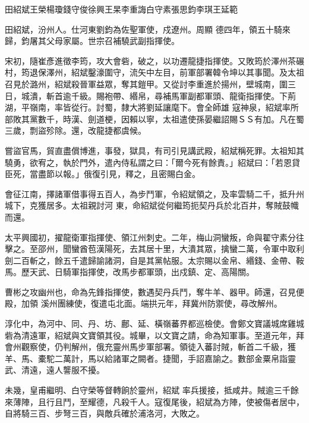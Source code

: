 
\begin{pinyinscope}

 田紹斌王榮楊瓊錢守俊徐興王杲李重誨白守素張思鈞李琪王延範



 田紹斌，汾州人。仕河東劉鈞為佐聖軍使，戍遼州。周顯
 德四年，領五十騎來歸，鈞屠其父母家屬。世宗召補驍武副指揮使。



 宋初，隨崔彥進徵李筠，攻大會砦，破之，以功遷龍捷指揮使。又敗筠於澤州茶碾村，筠退保澤州，紹斌鑿濠圍守，流矢中左目，前軍部署韓令坤以其事聞。及太祖召見於潞州，紹斌殺晉軍益眾，奪其鎧甲。又從討李重進於揚州，壁城南，圍三日，城潰，斬首逾千級。賜袍帶、緡帛，尋補馬軍副都軍頭、龍衛指揮使。下荊湖，平嶺南，率皆從行。討蜀，隸大將劉延讓麾下。會全師雄
 寇神泉，紹斌率所部敗其黨數千，時漢、劍道梗，因賴以寧，太祖遣使孫晏繼詔賜ＳＳ有加。凡在蜀三歲，剽盜殄除。還，改龍捷都虞候。



 嘗盜官馬，貿直盡償博進，事發，獄具，有司引見講武殿，紹斌稱死罪。太祖知其驍勇，欲宥之，執於門外，遣內侍私謂之曰：「爾今死有餘責。」紹斌曰：「若恩貸臣死，當盡節以報。」俄復引見，釋之，且密賜白金。



 會征江南，擇諸軍借事得五百人，為步鬥軍，令紹斌領之，及率雲騎二千，抵升州城下，克獲居多。太祖親討河
 東，命紹斌從何繼筠扼契丹兵於北百井，奪賊鼓幟而還。



 太平興國初，擢龍衛軍指揮使、領江州刺史。二年，梅山洞蠻叛，命與翟守素分往擊之。至邵州，聞蠻酋苞漢陽死，去其居十里，大潰其眾，擒蠻二萬，令軍中取利劍二百斬之，餘五千遣歸諭諸洞，自是其黨帖服。太宗賜以金帛、緡錢、金帶、鞍馬。歷天武、日騎軍指揮使，改馬步都軍頭，出戍鎮、定、高陽關。



 曹彬之攻幽州也，命為先鋒指揮使，數遇契丹兵鬥，奪牛羊、器甲。師還，召見便殿，加領
 溪州團練使，復遣屯北面。端拱元年，拜冀州防禦使，尋改解州。



 淳化中，為河中、同、丹、坊、鄜、延、橫嶺蕃界都巡檢使。會鄭文寶議城席雞城砦為清遠軍，紹斌與文寶領其役。城畢，以文寶之請，命為知軍事。至道元年，拜會州觀察使，仍判解州，俄充靈州馬步軍部署。領徒入蕃討賊，斬首二千級，獲羊、馬、橐駝二萬計，馬以給諸軍之闕者。捷聞，手詔嘉諭之。數部金粟帛詣靈武、清遠，遠人讋服不擾。



 未幾，皇甫繼明、白守榮等督轉餉於靈州，紹斌
 率兵援接，抵咸井。賊逾三千餘來薄陣，且行且鬥，至耀德，凡殺千人。寇復尾後，紹斌為方陣，使被傷者居中，自將騎三百、步弩三百，與敵兵確於浦洛河，大敗之。




\end{pinyinscope}
